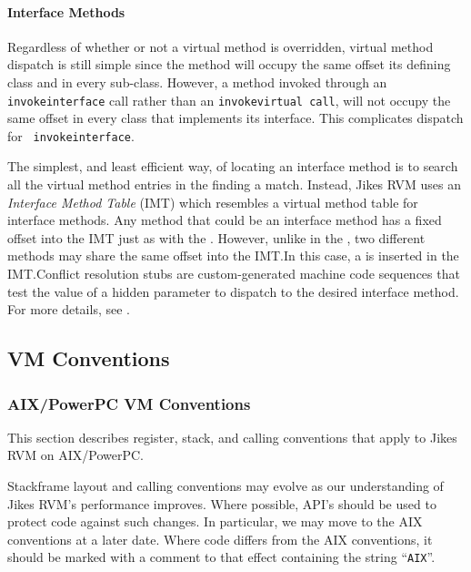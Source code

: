 \paragraph{Interface Methods}%
%
%
Regardless of whether or not a virtual method is overridden,
virtual method dispatch is still simple since the method will occupy 
the same  offset its defining class and in every sub-class.
However, a method invoked through an {\tt invokeinterface} call rather than
an {\tt invokevirtual call}, will not occupy the same  offset in every class that 
implements its interface.  This complicates dispatch for {\tt
invokeinterface}.

%
%
The simplest, and least efficient way, of locating an interface method 
is to search all the virtual method entries in the  finding a match.
Instead, Jikes RVM uses an {\em Interface Method Table} (IMT) which resembles
a virtual method table for interface methods. Any method that could be an interface method has 
a fixed offset into the IMT just as with the . However, unlike in the , two different methods may
share the same offset into the IMT.\@ In this case, a
 is inserted in the IMT.\@ Conflict resolution stubs are
custom-generated machine code sequences that test the value of a
hidden parameter to dispatch to the desired interface method.
For more details, see
.

\subsection{VM Conventions}

\subsubsection{AIX/PowerPC VM Conventions}
\label{aix-conventions}


This section describes register, stack, and calling conventions that apply to 
Jikes RVM on AIX\-/\-Pow\-er\-PC\TMweb{}.

Stackframe layout and calling conventions may evolve as our understanding
of Jikes RVM's performance improves.  Where possible, API's should be used
to protect code against such changes.  In particular, we may move to
the AIX\TMweb{} conventions at a later date.  Where code differs from the AIX
conventions, it should be marked with a comment to that effect containing
the string ``\texttt{AIX}''.


